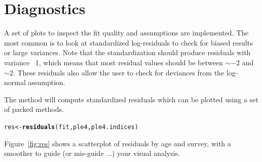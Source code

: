 \documentclass[a4paper,english,10pt]{article}\usepackage[]{graphicx}\usepackage[]{color}
\makeatletter
\newcommand{\hlstd}[1]{\textcolor[rgb]{0.345,0.345,0.345}{#1}}%
\newcommand{\hlkwb}[1]{\textcolor[rgb]{0.69,0.353,0.396}{#1}}%
\newcommand{\hlkwd}[1]{\textcolor[rgb]{0.737,0.353,0.396}{\textbf{#1}}}%
\newenvironment{kframe}{%
 \def\at@end@of@kframe{}%
 \ifinner\ifhmode%
  \def\at@end@of@kframe{\end{minipage}}%
  \begin{minipage}{\columnwidth}%
 \fi\fi%
 \def\FrameCommand##1{\hskip\@totalleftmargin \hskip-\fboxsep
 \colorbox{shadecolor}{##1}\hskip-\fboxsep
     \hskip-\linewidth \hskip-\@totalleftmargin \hskip\columnwidth}%
 \MakeFramed {\advance\hsize-\width
   \@totalleftmargin\z@ \linewidth\hsize
   \@setminipage}}%
 {\par\unskip\endMakeFramed%
 \at@end@of@kframe}
\newenvironment{knitrout}{}{} %
\makeatother
\begin{document}
\section{Diagnostics}

A set of plots to inspect the fit quality and assumptions are implemented. The most common is to look at standardized log-residuals to check for biased results or large variances. Note that the standardization should produce residuals with variance ~1, which means that most residual values should be between $\sim -2$ and $\sim 2$. These residuals also allow the user to check for deviances from the log-normal assumption.

The  method will compute standardized residuals which can be plotted using a set of packed methods.

\begin{knitrout}
\color{fgcolor}\begin{kframe}
\begin{alltt}
\hlstd{res} \hlkwb{<-} \hlkwd{residuals}\hlstd{(fit, ple4, ple4.indices)}
\end{alltt}
\end{kframe}
\end{knitrout}

Figure~\ref{fig:res} shows a scatterplot of residuals by age and survey, with a smoother to guide (or mis-guide ...) your visual analysis.
\end{document}
